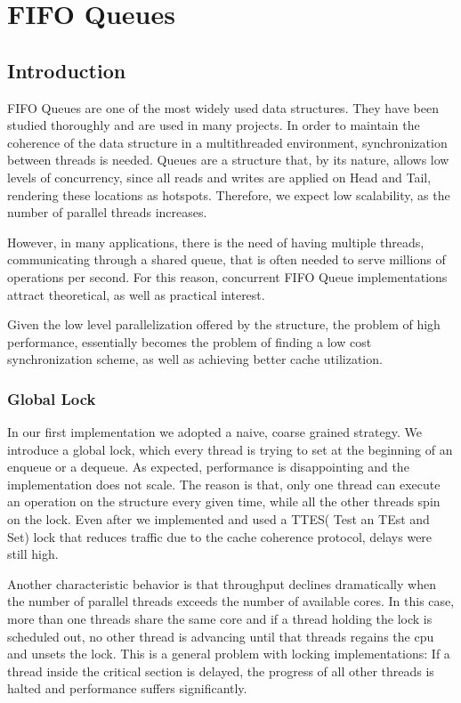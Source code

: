 \def\<#1>{\textit{#1}}

\chapter{FIFO Queues}
\section{Introduction}

FIFO Queues are one of the most widely used data structures. They have been studied thoroughly and are used in many projects. In order to maintain the coherence of the data structure in a multithreaded environment, synchronization between threads is needed. Queues are a structure that, by its nature, allows low levels of concurrency, since all reads and writes are applied on Head and Tail, rendering these locations as hotspots. Therefore, we expect low scalability, as the number of parallel threads increases.

However, in many applications, there is the need of having multiple threads, communicating through a shared queue, that is often needed to serve millions of operations per second. For this reason, concurrent FIFO Queue implementations attract theoretical, as well as practical interest. 

Given the low level parallelization offered by the structure, the problem of high performance, essentially becomes the problem of finding a low cost synchronization scheme, as well as achieving better cache utilization.

\subsection{Global Lock}
In our first implementation we adopted a naive, coarse grained strategy. We introduce a global lock, which every thread is trying to set at the beginning of an enqueue or a dequeue. As expected,  performance is disappointing and the implementation does not scale. The reason is that, only one thread can execute an operation on the structure every given time, while all the other threads spin on the lock. Even after we implemented and used a TTES( Test an TEst and Set) lock that reduces traffic due to the cache coherence protocol, delays were still high.

Another characteristic behavior is that throughput declines dramatically when the number of parallel threads exceeds the number of available cores. In this case, more than one threads share the same core and if a thread holding the lock is scheduled out, no other thread is advancing until that threads regains the cpu and unsets the lock. This is a general problem with locking implementations: If a thread inside the critical section is delayed, the progress of all other threads is halted and performance suffers significantly.

